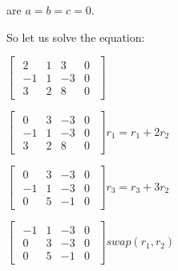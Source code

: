 \singlespacing
\singlespacing

are $a = b = c = 0$.

\singlespacing

So let us solve the equation:

\singlespacing
\singlespacing

\begin{math}
    \begin{bmatrix}
        \begin{array}{ccc|c}
            2  & 1 & 3  & 0 \\
            -1 & 1 & -3 & 0 \\
            3  & 2 & 8  & 0
        \end{array}
    \end{bmatrix}
\end{math}

\singlespacing

\begin{math}
    \begin{bmatrix}
        \begin{array}{ccc|c}
            0  & 3 & -3 & 0 \\
            -1 & 1 & -3 & 0 \\
            3  & 2 & 8  & 0
        \end{array}
    \end{bmatrix}r_1 = r_1 + 2r_2
\end{math}

\singlespacing

\begin{math}
    \begin{bmatrix}
        \begin{array}{ccc|c}
            0  & 3 & -3 & 0 \\
            -1 & 1 & -3 & 0 \\
            0  & 5 & -1 & 0
        \end{array}
    \end{bmatrix}r_3 = r_3 + 3r_2
\end{math}

\singlespacing

\begin{math}
    \begin{bmatrix}
        \begin{array}{ccc|c}
            -1 & 1 & -3 & 0 \\
            0  & 3 & -3 & 0 \\
            0  & 5 & -1 & 0
        \end{array}
    \end{bmatrix}swap(r_1, r_2)
\end{math}

